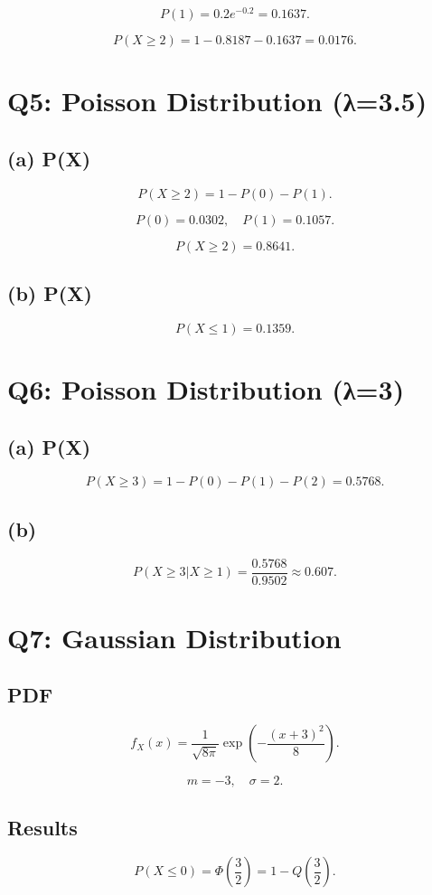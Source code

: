 \documentclass[12pt]{article}
\begin{document}
\[
P(1)=0.2e^{-0.2}=0.1637.
\]

\[
P(X\ge2)=1-0.8187-0.1637=0.0176.
\]

\section*{Q5: Poisson Distribution (λ=3.5)}

\subsection*{(a) P(X)}
\[
P(X\ge2)=1-P(0)-P(1).
\]

\[
P(0)=0.0302,\quad P(1)=0.1057.
\]

\[
P(X\ge2)=0.8641.
\]

\subsection*{(b) P(X)}
\[
P(X\le1)=0.1359.
\]

\section*{Q6: Poisson Distribution (λ=3)}

\subsection*{(a) P(X)}
\[
P(X\ge3)=1-P(0)-P(1)-P(2)=0.5768.
\]

\subsection*{(b)}
\[
P(X\ge3|X\ge1)=\frac{0.5768}{0.9502}\approx 0.607.
\]

\section*{Q7: Gaussian Distribution}

\subsection*{PDF}
\[
f_X(x)=\frac{1}{\sqrt{8\pi}}\exp\left(-\frac{(x+3)^2}{8}\right).
\]

\[
m=-3,\quad \sigma=2.
\]

\subsection*{Results}
\[
P(X\le0)=\Phi\left(\frac{3}{2}\right)=1-Q\left(\frac{3}{2}\right).
\]
\end{document}
